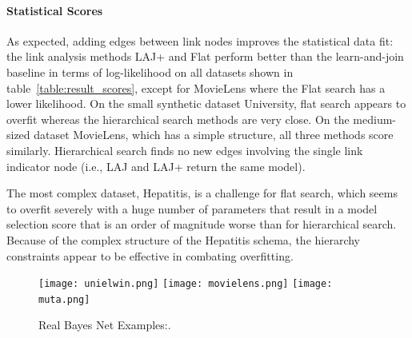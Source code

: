 \documentclass{article}
\begin{document}
\paragraph{Statistical Scores}

As expected, adding edges between link nodes improves the statistical data fit: 
the link analysis methods LAJ+ and Flat perform better than the learn-and-join baseline in terms of log-likelihood on all datasets shown in table~\ref{table:result_scores}, except for MovieLens where the Flat search has a lower likelihood. On the small synthetic dataset University, flat search appears to overfit whereas the hierarchical search methods are very close. On the medium-sized dataset MovieLens, which has a simple structure, all three methods score similarly. Hierarchical search finds no new edges involving the single link indicator node (i.e., LAJ and LAJ+ return the same model). 

The most complex dataset, Hepatitis, is a challenge for flat search, which seems to overfit severely with a huge number of parameters that result in a model selection score that is an order of magnitude worse than for hierarchical search. Because of the complex structure of the Hepatitis schema, the hierarchy constraints appear to be effective in combating overfitting.


\begin{figure}[htbp] %
   \centering

\texttt{[image: unielwin.png]}
\texttt{[image: movielens.png]}
\texttt{[image: muta.png]}

  \caption{Real Bayes Net Examples:.}
   \label{fig:BN_Examplse}
\end{figure}
\end{document}
